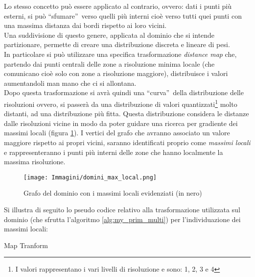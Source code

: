 {Lo stesso concetto può essere applicato al contrario, ovvero: dati i punti più esterni, si può \textquotedblleft sfumare\textquotedblright~verso quelli più interni cioè verso tutti quei punti con una massima distanza dai bordi rispetto ai loro vicini.\\
Una suddivisione di questo genere, applicata al dominio che si intende partizionare, permette di creare una distribuzione discreta e lineare di pesi.\\
In particolare si può utilizzare una specifica trasformazione \textit{distance map} che, partendo dai punti centrali delle zone a risoluzione minima locale (che comunicano cioè solo con zone a risoluzione maggiore), distribuisce i valori aumentandoli man mano che ci si allontana.\\
Dopo questa trasformazione si avrà quindi una \textquotedblleft curva\textquotedblright~della distribuzione delle risoluzioni ovvero, si passerà da una distribuzione di valori quantizzati\footnote{I valori rappresentano i vari livelli di risoluzione e sono: 1, 2, 3 e 4} molto distanti, ad una distribuzione più fitta. Questa distribuzione considera le distanze dalle risoluzioni vicine in modo da poter guidare una ricerca per gradiente dei massimi locali (figura \ref{fig:local_max_graph}).
I vertici del grafo che avranno associato un valore maggiore rispetto ai propri vicini, saranno identificati proprio come \emph{massimi locali} e rappresenteranno i punti più interni delle zone che hanno localmente la massima risoluzione.\\
\begin{figure}[H]
	\centering
	\texttt{[image: Immagini/domini\_max\_local.png]}
	\caption{Grafo del dominio con i massimi locali evidenziati (in nero)}
	\label{fig:local_max_graph}
\end{figure}

Si illustra di seguito lo pseudo codice relativo alla trasformazione utilizzata sul dominio (che sfrutta l'algoritmo \ref{alg:my_prim_multi}) per l'individuazione dei massimi locali:
\begin{algorithm}[H]
	\caption{Map Tranform}
	\label{alg:my_map_transfor}
	\begin{algorithmic}[1]
		\Statex
		\State{\color{blue}{//Inizializzazione di tutti i vertici}}
		\EndFor
		

\end{algorithmic}
\end{algorithm}}

